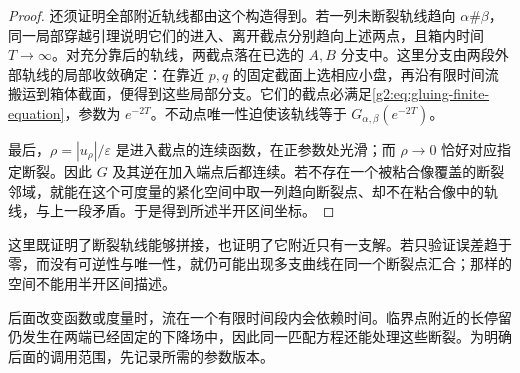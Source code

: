 \begin{proof}
	还须证明全部附近轨线都由这个构造得到。若一列未断裂轨线趋向 \(\alpha\#\beta\)，同一局部穿越引理说明它们的进入、离开截点分别趋向上述两点，且箱内时间 \(T\to\infty\)。对充分靠后的轨线，两截点落在已选的 \(A,B\) 分支中。这里分支由两段外部轨线的局部收敛确定：在靠近 \(p,q\) 的固定截面上选相应小盘，再沿有限时间流搬运到箱体截面，便得到这些局部分支。它们的截点必满足\eqref{g2:eq:gluing-finite-equation}，参数为 \(e^{-2T}\)。不动点唯一性迫使该轨线等于 \(G_{\alpha,\beta}(e^{-2T})\)。

	最后，\(\rho=|u_\rho|/\varepsilon\) 是进入截点的连续函数，在正参数处光滑；而 \(\rho\to0\) 恰好对应指定断裂。因此 \(G\) 及其逆在加入端点后都连续。若不存在一个被粘合像覆盖的断裂邻域，就能在这个可度量的紧化空间中取一列趋向断裂点、却不在粘合像中的轨线，与上一段矛盾。于是得到所述半开区间坐标。
\end{proof}

这里既证明了断裂轨线能够拼接，也证明了它附近只有一支解。若只验证误差趋于零，而没有可逆性与唯一性，就仍可能出现多支曲线在同一个断裂点汇合；那样的空间不能用半开区间描述。

\ProseParagraphBreak

后面改变函数或度量时，流在一个有限时间段内会依赖时间。临界点附近的长停留仍发生在两端已经固定的下降场中，因此同一匹配方程还能处理这些断裂。为明确后面的调用范围，先记录所需的参数版本。

